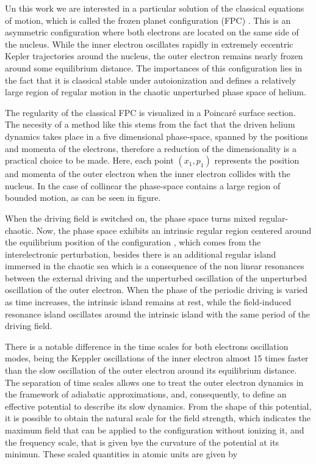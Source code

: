Un this work we are interested in a particular solution of the classical equations of motion, which is called the frozen planet configuration (FPC) \cite{RevModPhys.72.497,PhysRevLett.65.1965}. This is an asymmetric configuration where both electrons are located on the same side of the nucleus. While the inner electron oscillates rapidly in extremely eccentric Kepler trajectories around the nucleus, the outer electron remains nearly frozen around some equilibrium distance. The importances of this configuration lies in the fact that it is classical stable under autoionization and defines a relatively large region of regular motion in the chaotic unperturbed phase space of helium.

The regularity of the classical FPC is visualized in a Poincaré surface section. The necesity of a method like this stems from the fact that the driven helium dynamics takes place in a five dimensional phase-space, spanned by the positions and momenta of the electrons, therefore a reduction of the dimensionality is a practical choice to be made. Here, each point $ (x_{1},p_{1} ) $ represents the position and momenta of the outer electron when the inner electron collides with the nucleus. In the case of collinear the phase-space contains a large region of bounded motion, as can be seen in figure.

When the driving field is switched on, the phase space turns mixed regular-chaotic. Now, the phase space exhibits an intrinsic regular region centered around the equilibrium position of the configuration \cite{Schlagheck2003}, which comes from the interelectronic perturbation, besides there is an additional regular island immersed in the chaotic sea which is a consequence of the non linear resonances between the external driving and the unperturbed oscillation of the unperturbed oscillation of the outer electron. When the phase of the periodic driving is varied as time increases, the intrinsic island remains at rest, while the field-induced resonance island oscillates around the intrinsic island with the same period of the driving field.  

There is a notable difference in the time scales for both electrons oscillation modes, being the Keppler oscillations of the inner electron almost 15 times faster than the slow oscillation of the outer electron around its equilibrium distance. The separation of time scales allows one to treat the outer electron dynamics in the framework of adiabatic approximations, and,  consequently, to define an effective potential to describe its slow dynamics. From the shape of this potential, it is possible to obtain the natural scale for the field strength, which indicates the maximum field that can be applied to the configuration without ionizing it, and the frequency scale, that is given bye the curvature of the potential at its minimun. These scaled quantities in atomic units are given by

